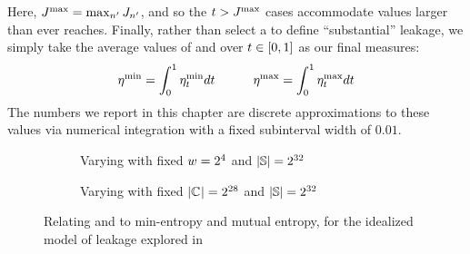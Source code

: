 Here, $J^{\textrm{max}} = \max_{n'}
J_{n'}$, and so the $t >
J^{\textrm{max}}$ cases accommodate \JaccardThreshold values larger than
\Jaccard{\secretsSetSize} ever reaches.  Finally, rather than select a
\JaccardThreshold to define ``substantial'' leakage, we simply take
the average values of \secretsSetSizeMin{\JaccardThreshold} and
\secretsSetSizeMax{\JaccardThreshold} over $t \in
[0,1]$ as our final measures:
\begin{align}
  \eta^{\textrm{min}}_{} = \int_{0}^{1} \eta^{\textrm{min}}_{t} dt
\hspace{3em}
  \eta^{\textrm{max}}_{} = \int_{0}^{1} \eta^{\textrm{max}}_{t} dt\label{eq:defnminmax}
\end{align}
The numbers we report in this chapter are discrete approximations to
these values via numerical integration with a fixed subinterval width
of $0.01$.
\begin{figure}
\begin{subfigure}[b]{0.45\columnwidth}
\resizebox{\textwidth}{!}{}
\caption{Varying \setSize{\classesUnion} with fixed $w=2^4$
  and $\left|{\mathbb{S}}\right|=2^{32}$}
\label{fig:model:C}
\end{subfigure}
\hfill
\begin{subfigure}[b]{0.45\columnwidth}
\hspace{-5ex}
\resizebox{\textwidth}{!}{}
\caption{Varying \classesSize with fixed
  $\left|{\mathbb{C}_{}}\right|=2^{28}$ and
  $\left|{\mathbb{S}}\right|=2^{32}$}
\label{fig:model:w}
\end{subfigure}
\caption{Relating \secretsSetSizeMin{} and \secretsSetSizeMax{} to
  min-entropy and mutual entropy, for the idealized model of leakage
  explored in }
\label{fig:model}
\end{figure}

